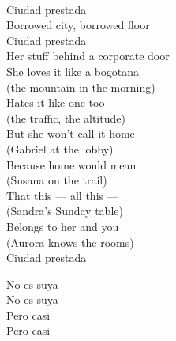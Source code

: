 \begin{lyrics}
\\
Ciudad prestada\\
Borrowed city, borrowed floor\\
Ciudad prestada\\
Her stuff behind a corporate door\\
She loves it like a bogotana\\
(the mountain in the morning)\\
Hates it like one too\\
(the traffic, the altitude)\\
But she won't call it home\\
(Gabriel at the lobby)\\
Because home would mean\\
(Susana on the trail)\\
That this — all this —\\
(Sandra's Sunday table)\\
Belongs to her and you\\
(Aurora knows the rooms)\\
Ciudad prestada

No es suya\\
No es suya\\
Pero casi\\
Pero casi
\end{lyrics}

